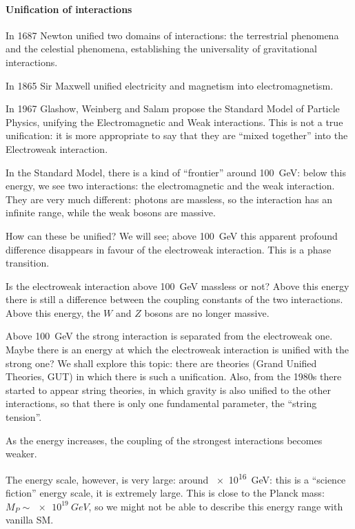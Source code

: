 \documentclass[main.tex]{subfiles}
\begin{document}
\paragraph{Unification of interactions}

In 1687 Newton unified two domains of interactions: the terrestrial phenomena and the celestial phenomena, establishing the universality of gravitational interactions. 

In 1865 Sir Maxwell unified electricity and magnetism into electromagnetism. 

In 1967 Glashow, Weinberg and Salam propose the Standard Model of Particle Physics, unifying the Electromagnetic and Weak interactions. 
This is not a true unification: it is more appropriate to say that they are ``mixed together'' into the Electroweak interaction.  

In the Standard Model, there is a kind of ``frontier'' around \SI{100}{GeV}: below this energy, we see two interactions: the electromagnetic and the weak interaction. 
They are very much different: photons are massless, so the interaction has an infinite range, while the weak bosons are massive. 

How can these be unified? We will see; above \SI{100}{GeV} this apparent profound difference disappears in favour of the electroweak interaction. 
This is a phase transition.

Is the electroweak interaction above \SI{100}{GeV} massless or not?
Above this energy there is still a difference between the coupling constants of the two interactions.
Above this energy, the \(W\) and \(Z\) bosons are no longer massive. 

Above \SI{100}{GeV} the strong interaction is separated from the electroweak one. Maybe there is an energy at which the electroweak interaction is unified with the strong one? 
We shall explore this topic: there are theories (Grand Unified Theories, GUT) in which there is such a unification.
Also, from the 1980s there started to appear string theories, in which gravity is also unified to the other interactions, so that there is only one fundamental parameter, the ``string tension''.

As the energy increases, the coupling of the strongest interactions becomes weaker.

The energy scale, however, is very large: around \SI{e16}{GeV}: this is a ``science fiction'' energy scale, it is extremely large. 
This is close to the Planck mass: \(M_P  \sim \SI{e19}{GeV}\), so we might not be able to describe this energy range with vanilla SM. 
\end{document}
